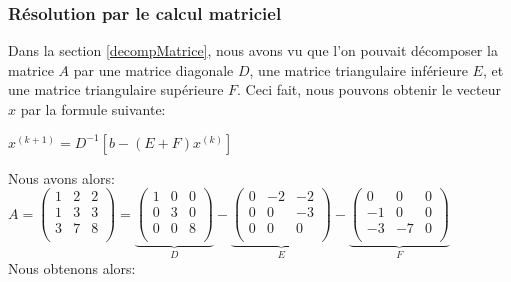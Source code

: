 \subsubsection{Résolution par le calcul matriciel}
Dans la section \ref{decompMatrice}, nous avons vu que l'on pouvait décomposer la matrice $A$ par une matrice diagonale $D$, une matrice triangulaire inférieure $E$, et une matrice triangulaire supérieure $F$. Ceci fait, nous pouvons obtenir le vecteur $x$ par la formule suivante: \\
\begin{center}
  $x^{(k+1)}=D^{-1}[b-(E+F)x^{(k)}]$\\
\end{center}
Nous avons alors:\vspace{8pt}\\
$A=
\begin{pmatrix}
  1&2&2\\
  1&3&3\\
  3&7&8\\
\end{pmatrix}=
\underbrace{\begin{pmatrix}
  1&0&0\\
  0&3&0\\
  0&0&8\\
\end{pmatrix}}_{D}-
\underbrace{\begin{pmatrix}
  0&-2&-2\\
  0&0&-3\\
  0&0&0\\
\end{pmatrix}}_{E}-
\underbrace{\begin{pmatrix}
  0&0&0\\
  -1&0&0\\
  -3&-7&0\\
\end{pmatrix}}_{F}
$\vspace{8pt}\\
Nous obtenons alors:\vspace{8pt}\\
